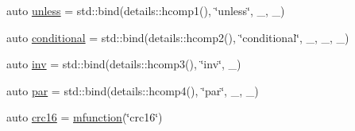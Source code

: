 \begin{DoxyCompactItemize}
\item 
auto \hyperlink{namespacepfq_1_1lang_1_1anonymous__namespace_02default_8hpp_03_a4873d64e4d84c7c4c4cabe782de2b7b0}{unless} = std\+::bind(details\+::hcomp1(), \char`\"{}unless\char`\"{}, \+\_, \+\_)
\item 
auto \hyperlink{namespacepfq_1_1lang_1_1anonymous__namespace_02default_8hpp_03_a99247b15a4e37c0aaec60838716fc8dc}{conditional} = std\+::bind(details\+::hcomp2(), \char`\"{}conditional\char`\"{}, \+\_, \+\_, \+\_)
\item 
auto \hyperlink{namespacepfq_1_1lang_1_1anonymous__namespace_02default_8hpp_03_a4e7c9b70d87164407c1dd1100ddd8363}{inv} = std\+::bind(details\+::hcomp3(), \char`\"{}inv\char`\"{}, \+\_)
\item 
auto \hyperlink{namespacepfq_1_1lang_1_1anonymous__namespace_02default_8hpp_03_abd0f7876a26a959f9fc211cc23599493}{par} = std\+::bind(details\+::hcomp4(), \char`\"{}par\char`\"{}, \+\_, \+\_)
\item 
auto \hyperlink{namespacepfq_1_1lang_1_1anonymous__namespace_02default_8hpp_03_a358abfac3e7be63cbb4557616ab81f31}{crc16} = \hyperlink{namespacepfq_1_1lang_ac3ec84f09576bf5fb5db464623a4c165}{mfunction}(\char`\"{}crc16\char`\"{})
\end{DoxyCompactItemize}


